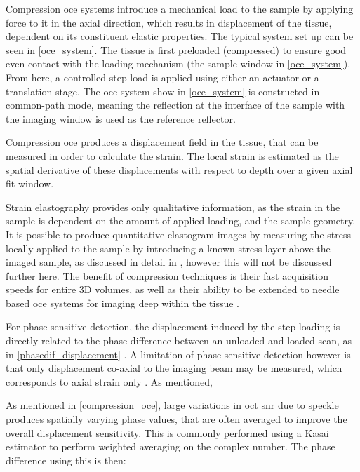Compression \ac{oce} systems introduce a mechanical load to the sample by applying force to it in the axial direction, which results in displacement of the tissue, dependent on its constituent elastic properties. The typical system set up can be seen in \autoref{oce_system}. The tissue is first preloaded (compressed) to ensure good even contact with the loading mechanism (the sample window in \autoref{oce_system}). From here, a controlled step-load is applied using either an actuator or a translation stage. The \ac{oce} system show in \autoref{oce_system} is constructed in common-path mode, meaning the reflection at the interface of the sample with the imaging window is used as the reference reflector. 

Compression \ac{oce} produces a displacement field in the tissue, that can be measured in order to calculate the strain. The local strain is estimated as the spatial derivative of these displacements with respect to depth \cite{kennedy_review_2014} over a given axial fit window. 

Strain elastography provides only qualitative information, as the strain in the sample is dependent on the amount of applied loading, and the sample geometry.
It is possible to produce quantitative elastogram images by measuring the stress locally applied to the sample by introducing a known stress layer above the imaged sample, as discussed in detail in \cite{kennedy_quantitative_2015}, however this will not be discussed further here. The benefit of compression techniques is their fast acquisition speeds for entire 3D volumes, as well as their ability to be extended to needle based \ac{oce} systems for imaging deep within the tissue \cite{kennedy_review_2014}. 

For phase-sensitive detection, the displacement induced by the step-loading is directly related to the phase difference between an unloaded and loaded scan, as in \autoref{phasedif_displacement} \cite{kennedy_strain_2012}. A limitation of phase-sensitive detection however is that only displacement co-axial to the imaging beam may be measured, which corresponds to axial strain only \cite{wijesinghe_improving_2017}. As mentioned, 

As mentioned in \autoref{compression_oce}, large variations in \ac{oct} \ac{snr} due to speckle produces spatially varying phase values, that are often averaged to improve the overall displacement sensitivity. This is commonly performed using a Kasai estimator \cite{zaitsev_hybrid_2016} \cite{wijesinghe_improving_2017} to perform weighted averaging on the complex number. The phase difference using this is then:

